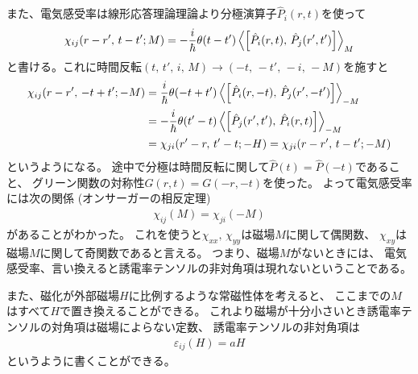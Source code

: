 \documentclass[9pt,dvipdfmx,a4paper]{jsarticle}
\begin{document}
また、電気感受率は線形応答理論理論より分極演算子\(\hat{P}_i(r,t)\)を使って
\begin{align}
    \chi_{ij}(r-r',\,t-t';M) = -\frac{i}{\hbar}\theta(t-t')\ev{\left[\hat{P}_i(r,t),\,\hat{P}_j(r',t')\right]}_{M}
\end{align}
と書ける。これに時間反転\((t,\,t',\,i,\,M)\rightarrow(-t,\,-t',\,-i,\,-M)\)を施すと
\begin{align}
    \chi_{ij}(r-r',\,-t+t';-M)
    &= \frac{i}{\hbar}\theta(-t+t')\ev{\left[\hat{P}_i(r,-t),\,\hat{P}_j(r',-t')\right]}_{-M}\notag\\
    &= -\frac{i}{\hbar}\theta(t'-t)\ev{\left[\hat{P}_j(r',t'),\,\hat{P}_i(r,t)\right]}_{-M}\notag\\
    &= \chi_{ji}(r'-r,\,t'-t;-H) = \chi_{ji}(r-r',\,t-t';-M)
\end{align}
というようになる。
途中で分極は時間反転に関して\(\hat{P}(t)=\hat{P}(-t)\)であること、
グリーン関数の対称性\(G(r,t)=G(-r,-t)\)を使った。
よって電気感受率には次の関係 (オンサーガーの相反定理)
\begin{align}
    \chi_{ij}(M) = \chi_{ji}(-M)
\end{align}
があることがわかった。
これを使うと\(\chi_{xx},\,\chi_{yy}\)は磁場\(M\)に関して偶関数、
\(\chi_{xy}\)は磁場\(M\)に関して奇関数であると言える。
つまり、磁場\(M\)がないときには、
電気感受率、言い換えると誘電率テンソルの非対角項は現れないということである。

また、磁化が外部磁場\(H\)に比例するような常磁性体を考えると、
ここまでの\(M\)はすべて\(H\)で置き換えることができる。
これより磁場が十分小さいとき誘電率テンソルの対角項は磁場によらない定数、
誘電率テンソルの非対角項は
\begin{align}
    \varepsilon_{ij}(H) = aH
\end{align}
というように書くことができる。
\end{document}

